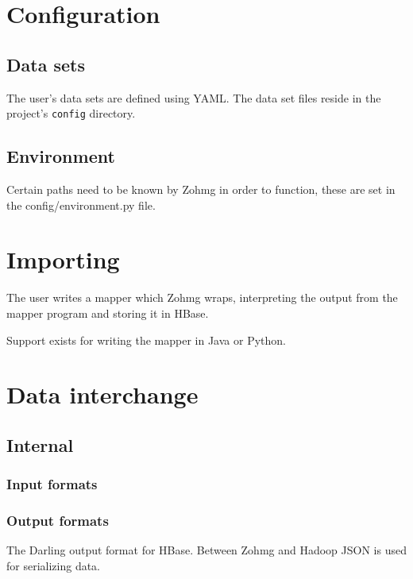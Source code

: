 \documentclass[a4paper,10pt]{book}
\begin{document}
\section{Configuration}

\subsection{Data sets}


The user's data sets are defined using YAML. The data set files reside in
the project's \texttt{config} directory.


\subsection{Environment}

Certain paths need to be known by Zohmg in order to function, these are set
in the config/environment.py file.



\section{Importing}

The user writes a mapper which Zohmg wraps, interpreting the output from
the mapper program and storing it in HBase.

Support exists for writing the mapper in Java or Python.



\section{Data interchange}

\subsection{Internal}

\subsubsection{Input formats}

\subsubsection{Output formats}

The Darling output format for HBase. Between Zohmg and Hadoop JSON is used
for serializing data.
\end{document}
